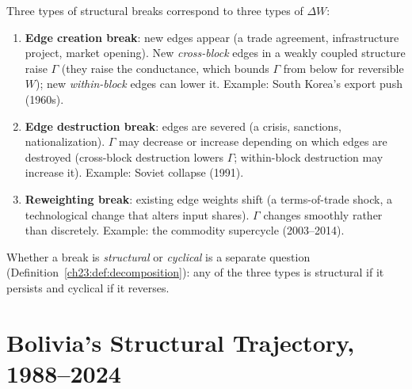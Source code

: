\documentclass[../structural_economics_book.tex]{subfiles}
\begin{document}
\begin{definition}\label{ch23:prop:break_types}
Three types of structural breaks correspond to three types of $\Delta W$:
\begin{enumerate}
\item \textbf{Edge creation break}: new edges appear (a trade agreement, infrastructure project, market opening). New \emph{cross-block} edges in a weakly coupled structure raise $\Gamma$ (they raise the conductance, which bounds $\Gamma$ from below for reversible $W$); new \emph{within-block} edges can lower it. Example: South Korea's export push (1960s).
\item \textbf{Edge destruction break}: edges are severed (a crisis, sanctions, nationalization). $\Gamma$ may decrease or increase depending on which edges are destroyed (cross-block destruction lowers $\Gamma$; within-block destruction may increase it). Example: Soviet collapse (1991).
\item \textbf{Reweighting break}: existing edge weights shift (a terms-of-trade shock, a technological change that alters input shares). $\Gamma$ changes smoothly rather than discretely. Example: the commodity supercycle (2003--2014).
\end{enumerate}
Whether a break is \emph{structural} or \emph{cyclical} is a separate question (Definition~\ref{ch23:def:decomposition}): any of the three types is structural if it persists and cyclical if it reverses.
\end{definition}


\section{Bolivia's Structural Trajectory, 1988--2024}
\label{ch23:sec:bolivia}
\end{document}
